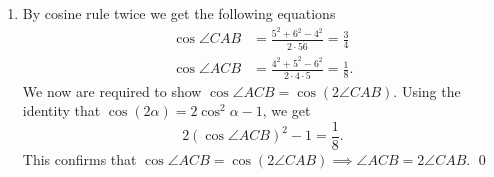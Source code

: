 \begin{enumerate}[font=\bfseries]
\begin{enumerate}[font=\bfseries]
\begin{align*}
                        \cos(\angle ACB)   & = -\frac{1}{2}                        \\
                        \angle ACB         & = \frac{2}{3}\pi.
                    \end{align*} \qed
              \item[b.] By cosine rule twice we get the following equations
                    \begin{align*}
                        \cos \angle CAB & = \frac{5^2 + 6^2 - 4^2}{2 \cdot 5 \dot 6} = \frac{3}{4}   \\
                        \cos \angle ACB & = \frac{4^2 + 5^2 - 6^2}{2 \cdot 4 \cdot 5} = \frac{1}{8}.
                    \end{align*}
                    We now are required to show \(\cos \angle ACB = \cos (2 \angle CAB)\). Using the identity that \(\cos (2 \alpha) = 2\cos^2 \alpha - 1\), we get
                    \[2 \left(\cos \angle ACB\right)^2 - 1 = \frac{1}{8}.\]
                    This confirms that \(\cos \angle ACB = \cos (2 \angle CAB) \implies \angle ACB = 2 \angle CAB\). \qed
          \end{enumerate}
\end{enumerate}

